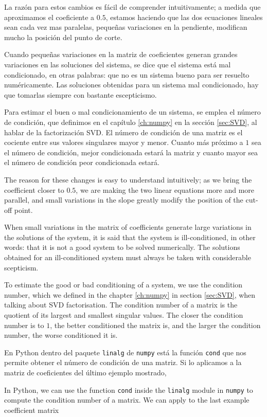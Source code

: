 \begin{paracol}{2}
\switchcolumn
La razón para estos cambios es fácil de comprender intuitivamente; a medida que aproximamos el coeficiente a $0.5$, estamos haciendo que las dos ecuaciones lineales sean cada vez mas paralelas, pequeñas variaciones en la pendiente, modifican mucho la posición del punto de corte.

Cuando pequeñas variaciones en la matriz de coeficientes generan grandes variaciones en las soluciones del sistema, se dice que el sistema está mal condicionado, en otras palabras: que no es un sistema bueno para ser resuelto numéricamente. Las soluciones obtenidas para un sistema mal condicionado, hay que tomarlas siempre con bastante escepticismo.

Para estimar el buen o mal condicionamiento de un sistema, se emplea el número de condición, que definimos en el capítulo \ref{ch:numpy} en la sección \ref{sec:SVD}, al hablar de la factorización SVD. El número de condición de una matriz es el cociente entre sus valores singulares mayor y menor.  Cuanto más próximo a $1$ sea el número de condición, mejor condicionada estará la matriz y cuanto mayor sea el número de condición peor condicionada estará.

\switchcolumn
The reason for these changes is easy to understand intuitively; as we bring the coefficient closer to $0.5$, we are making the two linear equations more and more parallel, and small variations in the slope greatly modify the position of the cut-off point.

When small variations in the matrix of coefficients generate large variations in the solutions of the system, it is said that the system is ill-conditioned, in other words: that it is not a good system to be solved numerically. The solutions obtained for an ill-conditioned system must always be taken with considerable scepticism.

To estimate the good or bad conditioning of a system, we use the condition number, which we defined in the chapter \ref{ch:numpy} in section \ref{sec:SVD}, when talking about SVD factorisation. The condition number of a matrix is the quotient of its largest and smallest singular values.  The closer the condition number is to $1$, the better conditioned the matrix is, and the larger the condition number, the worse conditioned it is.

\switchcolumn

En Python dentro del paquete \texttt{linalg} de \texttt{numpy} está la función \texttt{cond} que nos permite obtener el número de condición de una matriz. Si lo aplicamos a la matriz de coeficientes del último ejemplo mostrado,

\switchcolumn
In Python, we can use the function \texttt{cond} inside the \texttt{linalg} module in \texttt{numpy} to compute the condition number of a matrix. We can apply to the last example coefficient matrix

\end{paracol}

